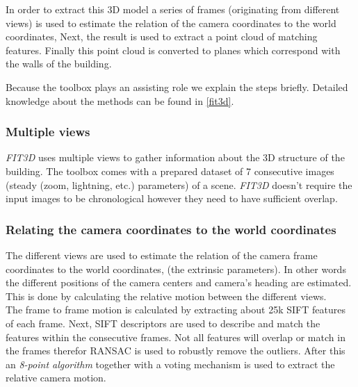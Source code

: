 In order to extract this 3D model a series of frames (originating from different
views) is used to estimate the relation of the camera coordinates to the
world coordinates, Next, the result is used to extract a point cloud of matching
features. Finally this point cloud is converted to planes which correspond with the walls of the building.

Because the toolbox plays an assisting role we explain the steps briefly.
Detailed knowledge about the methods can be found in \ref{fit3d}.

\subsubsection{Multiple views}
\emph{FIT3D} uses multiple views to gather information about the 3D structure of the
building. The toolbox comes with a prepared dataset of 7 consecutive images (steady (zoom, lightning,
etc.) parameters) of a scene.  \emph{FIT3D} doesn't require the input images to be
chronological however they need to have sufficient overlap. 


\subsubsection{Relating the camera coordinates to the world coordinates}
The different views are used to estimate the relation of the camera frame
coordinates to the world coordinates, (the extrinsic parameters).  In other
words the different positions of the camera centers and camera's heading are
estimated.  This is done by calculating the relative motion between the
different views.\\

The frame to frame motion is calculated by extracting about 25k SIFT features of
each frame.  Next, SIFT descriptors are used to describe and match the features
within the consecutive frames.  Not all features will overlap or match in the
frames therefor RANSAC is used to robustly remove the outliers.  After this an
\emph{8-point algorithm} together with a voting mechanism is used to extract the
relative camera motion.\\

